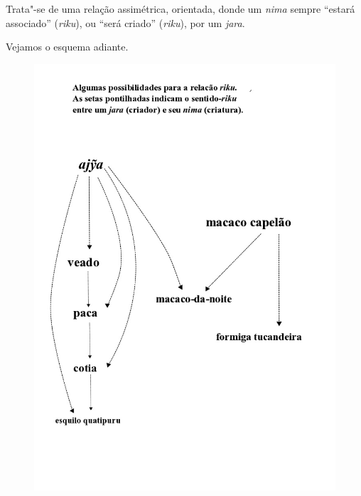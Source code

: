 Trata"-se de uma relação assimétrica, orientada, donde um \emph{nima}
sempre ``estará associado'' (\emph{riku}), ou ``será criado''
(\emph{riku}), por um \emph{jara}.

Vejamos o esquema adiante.

\begin{figure}[H]
\centering
  \includegraphics[width=\textwidth]{./imgs/Figura_11}
\end{figure}


